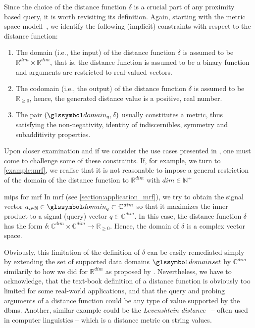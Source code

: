 Since the choice of the distance function $\delta$ is a crucial part of any proximity based query, it is worth revisiting its definition. Again, starting with the metric space modell~\cite{Zezula:2006similarity}, we identify the following (implicit) constraints with respect to the distance function:

\begin{enumerate}
    \item The domain (i.e., the input) of the distance function $\delta$ is assumed to be $\mathbb{R}^{dim} \times \mathbb{R}^{dim}$, that is, the distance function is assumed to be a binary function and arguments are restricted to real-valued vectors.
    \item The codomain (i.e., the output) of the distance function $\delta$ is assumed to be $\mathbb{R}_{\geq 0}$, hence, the generated distance value is a positive, real number.
    \item The pair $(\domain_q,\delta)$ usually constitutes a metric, thus satisfying the non-negativity, identity of indiscernibles, symmetry and subadditivity properties.
\end{enumerate}

Upon closer examination and if we consider the use cases presented in , one must come to challenge some of these constraints. If, for example, we turn to \cref{example:mrf}, we realise that it is not reasonable to impose a general restriction of the domain of the distance function to $\mathbb{R}^{dim}$ with $dim \in \mathbb{N^{+}}$

\begin{example}[label=example:mrf]{\acrlong{mips}{} for \acrshort{mrf}}{}
    In \acrshort{mrf} (see \cref{section:application_mrf}), we try to obtain the signal vector $a_{i \in \mathbb{N}} \in \domain_q \subset \mathbb{C}^{dim}$ so that it maximizes the inner product to a signal (query) vector $q \in \mathbb{C}^{dim}$. In this case, the distance function $\delta$ has the form $\delta \colon \mathbb{C}^{dim} \times \mathbb{C}^{dim} \to \mathbb{R}_{\geq 0}$. Hence, the domain of $\delta$ is a complex vector space.
\end{example}

Obviously, this limitation of the definition of $\delta$ can be easily remediated simply by extending the set of supported data domains $\domainset$ by $\mathbb{C}^{dim}$ similarily to how we did for $\mathbb{R}^{dim}$ as proposed by \cite{Giangreco:2018thesis}. Nevertheless, we have to acknowledge, that the text-book definition of a distance function is obviously too limited for some real-world applications, and that the query and probing arguments of a distance function could be any type of value supported by the \acrshort{dbms}. Another, similar example could be the \emph{Levenshtein distance}~\cite{Levensthtein:1965Binary} -- often used in computer linguistics -- which is a distance metric on string values.

